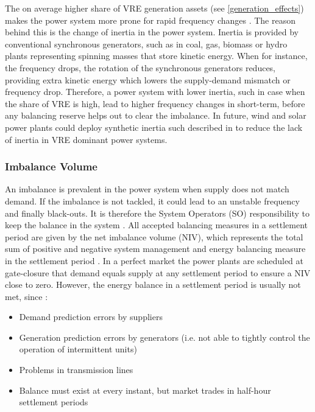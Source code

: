 \documentclass[energies,article,submit,moreauthors,pdftex]{Definitions/mdpi}
\begin{document}
The on average higher share of VRE generation assets (see \ref{generation_effects}) makes the power system more prone for rapid frequency changes \cite{Ela2011OperatingReserves.}. The reason behind this is the change of inertia in the power system. Inertia is provided by conventional synchronous generators, such as in coal, gas, biomass or hydro plants representing spinning masses that store kinetic energy. When for instance, the frequency drops, the rotation of the synchronous generators reduces, providing extra kinetic energy which lowers the supply-demand mismatch or frequency drop. Therefore, a power system with lower inertia, such in case when the share of VRE is high, lead to higher frequency changes in short-term, before any balancing reserve helps out to clear the imbalance. In future, wind and solar power plants could deploy synthetic inertia such described in \cite{Hansen2014AnalysisTurbines, Zeni2013VirtualTurbines, Liu2017PV-basedSystem} to reduce the lack of inertia in VRE dominant power systems.




\subsubsection{Imbalance Volume}\label{section:ImbalanceVolume}

An imbalance is prevalent in the power system when supply does not match demand. If the imbalance is not tackled, it could lead to an unstable frequency and finally black-outs. It is therefore the System Operators (SO) responsibility to keep the balance in the system \cite{ELEXON2020ELEXONBMRS}. All accepted balancing measures in a settlement period are given by the net imbalance volume (NIV), which represents the total sum of positive and negative system management and energy balancing measure in the settlement period \cite{ELEXON2020ELEXONBMRS}. In a perfect market the power plants are scheduled at gate-closure that demand equals supply at any settlement period to ensure a NIV close to zero. However, the energy balance in a settlement period is usually not met, since \cite{ELEXON2019GuidanceBritain}:
\begin{itemize}
    \item Demand prediction errors by suppliers
    \item Generation prediction errors by generators (i.e. not able to tightly control the operation of intermittent units)
    \item Problems in transmission lines
    \item Balance must exist at every instant, but market trades in half-hour settlement periods 
\end{itemize}
\end{document}
